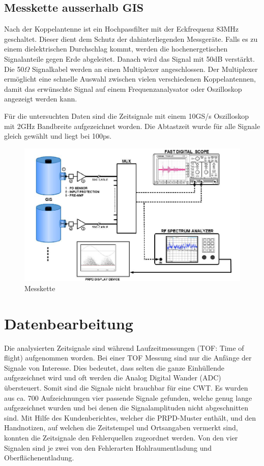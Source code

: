 \begin{refsection}
\subsection{Messkette ausserhalb GIS}
Nach der Koppelantenne ist ein Hochpassfilter mit der Eckfrequenz 83MHz geschaltet.
Dieser dient dem Schutz der dahinterliegenden Messgeräte.
Falls es zu einem dielektrischen Durchschlag kommt, werden die hochenergetischen Signalanteile gegen Erde abgeleitet.
Danach wird das Signal mit 50dB verstärkt.
Die 50$\Omega$ Signalkabel werden an einen Multiplexer angeschlossen. 
Der Multiplexer ermöglicht eine schnelle Auswahl zwischen vielen verschiedenen Koppelantennen, damit das erwünschte Signal auf einem Frequenzanalysator oder Oszilloskop angezeigt werden kann. 

Für die untersuchten Daten sind die Zeitsignale mit einem 10GS/s Oszilloskop mit 2GHz Bandbreite aufgezeichnet worden.
Die Abtastzeit wurde für alle Signale gleich gewählt und liegt bei 100ps. 
\begin{figure}
	\centering
	\includegraphics[width=0.9\linewidth]{papers/gis/Bilder/MessketteAusGIS}
	\caption{Messkette \cite{report:ABBOnSite}}
	\label{fig:messketteausgis}
\end{figure}

 
\section{Datenbearbeitung}

Die analysierten Zeitsignale sind während Laufzeitmessungen (TOF: Time of flight) aufgenommen worden. 
Bei einer TOF Messung sind nur die Anfänge der Signale von Interesse.
Dies bedeutet, dass selten die ganze Einhüllende aufgezeichnet wird und oft werden die Analog Digital Wander (ADC) übersteuert. 
Somit sind die Signale nicht brauchbar für eine CWT.
Es wurden aus ca. 700 Aufzeichnungen vier passende Signale gefunden, welche genug lange aufgezeichnet wurden und bei denen die Signalamplituden nicht abgeschnitten sind. 
Mit Hilfe des Kundenberichtes, welcher die PRPD-Muster enthält, und den Handnotizen, auf welchen die Zeitstempel und Ortsangaben vermerkt sind, konnten die Zeitsignale den Fehlerquellen zugeordnet werden.
Von den vier Signalen sind je zwei von den Fehlerarten Hohlraumentladung und Oberflächenentladung.
\begin{figure}
	\centering
	

\end{figure}
\end{refsection}
